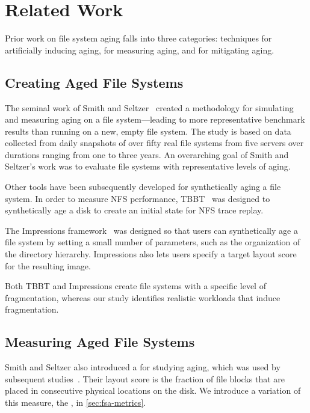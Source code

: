\section{Related Work}\label{sec:fsa-related}
Prior work on file system aging falls into three categories:
techniques for artificially inducing aging, for
measuring aging, and for mitigating aging.

\subsection{Creating Aged File Systems}

The seminal work of Smith and Seltzer~\cite{DBLP:conf/sigmetrics/SmithS97}
created a methodology for simulating and measuring aging on a file
system---leading to more representative benchmark results than running on a
new, empty file system.  The study is based on data  collected from daily
snapshots of over fifty real file systems from five servers over durations
ranging from one to three years.  An overarching goal of Smith and Seltzer's
work was to evaluate file systems with representative levels of aging.

Other tools have been subsequently developed for synthetically aging a file
system.  In order to measure NFS performance,
TBBT~\cite{DBLP:conf/fast/ZhuCC05} was designed to synthetically age a disk to
create an initial state for NFS trace replay.

The Impressions framework~\cite{DBLP:journals/tos/AgrawalAA09} was designed so
that users can synthetically age a file system by setting a small number of
parameters, such as the organization of the directory hierarchy.  Impressions
also lets users specify a target layout score for the resulting image.

Both TBBT and Impressions create file systems with a specific level of
fragmentation, whereas our study identifies realistic workloads that induce
fragmentation. 

\subsection{Measuring Aged File Systems}

Smith and Seltzer also introduced a  for studying aging,
which was used by subsequent
studies~\cite{DBLP:conf/mascots/AhnKCP02,DBLP:journals/tos/AgrawalAA09}. Their
layout score is the fraction of file blocks that are placed in consecutive
physical locations on the disk. We introduce a variation of this measure, the
, in \cref{sec:fsa-metrics}.

